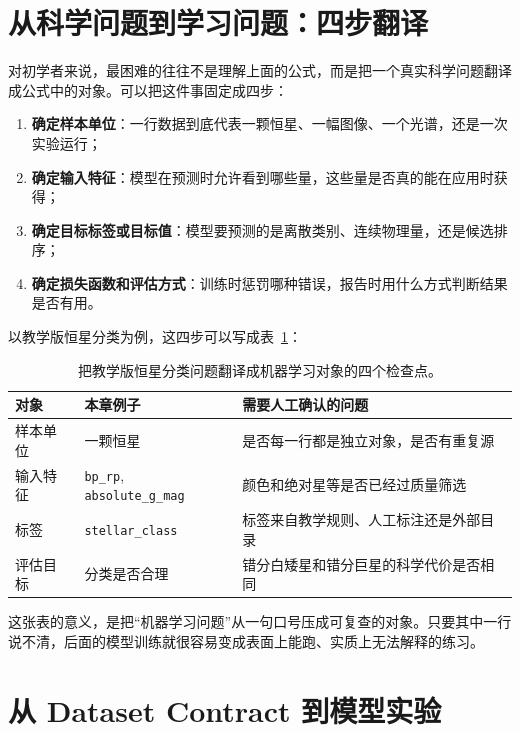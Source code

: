 \section{从科学问题到学习问题：四步翻译}

对初学者来说，最困难的往往不是理解上面的公式，而是把一个真实科学问题翻译成公式中的对象。可以把这件事固定成四步：

\begin{enumerate}
    \item \textbf{确定样本单位}：一行数据到底代表一颗恒星、一幅图像、一个光谱，还是一次实验运行；
    \item \textbf{确定输入特征}：模型在预测时允许看到哪些量，这些量是否真的能在应用时获得；
    \item \textbf{确定目标标签或目标值}：模型要预测的是离散类别、连续物理量，还是候选排序；
    \item \textbf{确定损失函数和评估方式}：训练时惩罚哪种错误，报告时用什么方式判断结果是否有用。
\end{enumerate}

以教学版恒星分类为例，这四步可以写成表~\ref{tab:ch16_ml_problem_translation}：

\begin{table}[htbp]
\centering
\begin{tabular}{p{}p{}p{}}
\toprule
对象 & 本章例子 & 需要人工确认的问题 \\
\midrule
样本单位 & 一颗恒星 & 是否每一行都是独立对象，是否有重复源 \\
输入特征 & \texttt{bp\_rp}, \texttt{absolute\_g\_mag} & 颜色和绝对星等是否已经过质量筛选 \\
标签 & \texttt{stellar\_class} & 标签来自教学规则、人工标注还是外部目录 \\
评估目标 & 分类是否合理 & 错分白矮星和错分巨星的科学代价是否相同 \\
\bottomrule
\end{tabular}
\caption{把教学版恒星分类问题翻译成机器学习对象的四个检查点。}
\label{tab:ch16_ml_problem_translation}
\end{table}

这张表的意义，是把“机器学习问题”从一句口号压成可复查的对象。只要其中一行说不清，后面的模型训练就很容易变成表面上能跑、实质上无法解释的练习。

\section{从 Dataset Contract 到模型实验}

